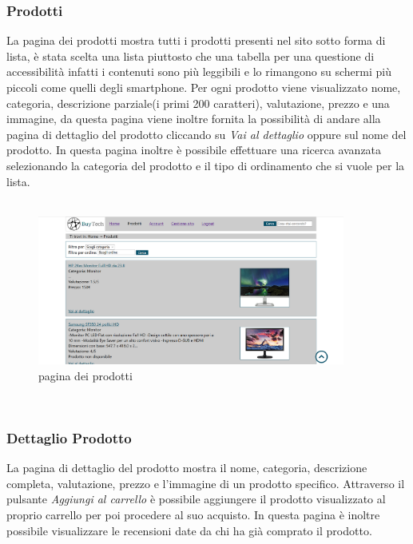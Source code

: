 \subsubsection{Prodotti}
La pagina dei prodotti mostra tutti i prodotti presenti nel sito sotto forma di lista, è stata scelta una lista piuttosto che una tabella per una questione di accessibilità infatti i contenuti sono più leggibili e lo rimangono su schermi più piccoli come quelli degli smartphone.\newline
Per ogni prodotto viene visualizzato nome, categoria, descrizione parziale(i primi 200 caratteri), valutazione, prezzo e una immagine, da questa pagina viene inoltre fornita la possibilità di andare alla pagina di dettaglio del prodotto cliccando su \emph{Vai al dettaglio} oppure sul nome del prodotto.\newline
In questa pagina inoltre è possibile effettuare una ricerca avanzata selezionando la categoria del prodotto e il tipo di ordinamento che si vuole per la lista. \mbox{} \\ \mbox{} \\ \Spazio

\begin{figure}[h!]
	\label{prodotti} 
	\centering 
	\includegraphics[width=0.9\textwidth]{immagini/prodotti.png}
	\caption{pagina dei prodotti} 
\end{figure}
\mbox{} \\

\subsubsection{Dettaglio Prodotto}
La pagina di dettaglio del prodotto mostra il nome, categoria, descrizione completa, valutazione, prezzo e l'immagine di un prodotto specifico.\newline
Attraverso il pulsante \emph{Aggiungi al carrello} è possibile aggiungere il prodotto visualizzato al proprio carrello per poi procedere al suo acquisto.\newline
In questa pagina è inoltre possibile visualizzare le recensioni date da chi ha già comprato il prodotto.


